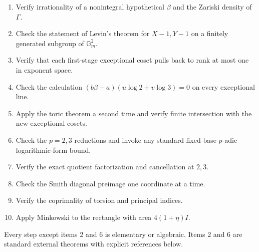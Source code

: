 \documentclass[11pt,oneside]{article}
\theoremstyle{definition}
\newcommand{\Gm}{\mathbb{G}_{m}}
\begin{document}
\begin{enumerate}
  \item Verify irrationality of a nonintegral hypothetical $\beta$ and the
        Zariski density of $\Gamma$.
  \item Check the statement of Levin's theorem for $X-1,Y-1$ on a finitely
        generated subgroup of $\Gm^2$.
  \item Verify that each first-stage exceptional coset pulls back to rank
        at most one in exponent space.
  \item Check the calculation
        $(b\beta-a)(u\log2+v\log3)=0$ on every exceptional line.
  \item Apply the toric theorem a second time and verify finite intersection
        with the new exceptional cosets.
  \item Check the $p=2,3$ reductions and invoke any standard fixed-base
        $p$-adic logarithmic-form bound.
  \item Verify the exact quotient factorization and cancellation at
        $2,3$.
  \item Check the Smith diagonal preimage one coordinate at a time.
  \item Verify the coprimality of torsion and principal indices.
  \item Apply Minkowski to the rectangle with area
        $4(1+\eta)I$.
\end{enumerate}

Every step except items 2 and 6 is elementary or algebraic.  Items 2 and 6
are standard external theorems with explicit references below.
\end{document}
